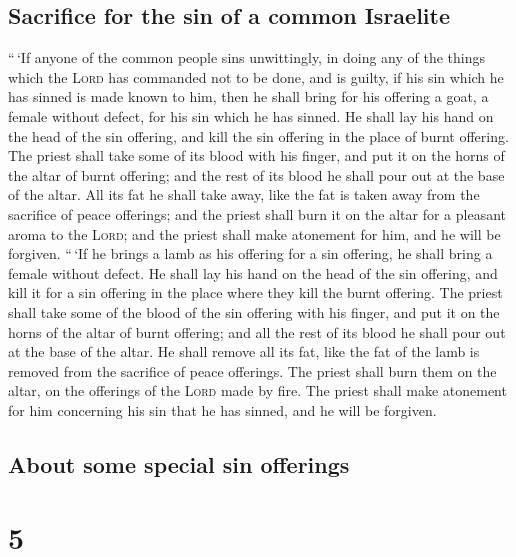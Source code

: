 \hypertarget{sacrifice-for-the-sin-of-a-common-israelite}{%
\subsection{Sacrifice for the sin of a common
Israelite}\label{sacrifice-for-the-sin-of-a-common-israelite}}

 ``\,`If anyone of the common people sins unwittingly, in
doing any of the things which the \textsc{Lord} has commanded not to be
done, and is guilty,  if his sin which he has sinned is
made known to him, then he shall bring for his offering a goat, a female
without defect, for his sin which he has sinned.  He
shall lay his hand on the head of the sin offering, and kill the sin
offering in the place of burnt offering.  The priest
shall take some of its blood with his finger, and put it on the horns of
the altar of burnt offering; and the rest of its blood he shall pour out
at the base of the altar.  All its fat he shall take
away, like the fat is taken away from the sacrifice of peace offerings;
and the priest shall burn it on the altar for a pleasant aroma to the
\textsc{Lord}; and the priest shall make atonement for him, and he will
be forgiven.  ``\,`If he brings a lamb as his offering
for a sin offering, he shall bring a female without defect.
 He shall lay his hand on the head of the sin offering,
and kill it for a sin offering in the place where they kill the burnt
offering.  The priest shall take some of the blood of the
sin offering with his finger, and put it on the horns of the altar of
burnt offering; and all the rest of its blood he shall pour out at the
base of the altar.  He shall remove all its fat, like the
fat of the lamb is removed from the sacrifice of peace offerings. The
priest shall burn them on the altar, on the offerings of the
\textsc{Lord} made by fire. The priest shall make atonement for him
concerning his sin that he has sinned, and he will be forgiven.

\hypertarget{about-some-special-sin-offerings}{%
\subsection{About some special sin
offerings}\label{about-some-special-sin-offerings}}

\hypertarget{section-4}{%
\section{5}\label{section-4}}

